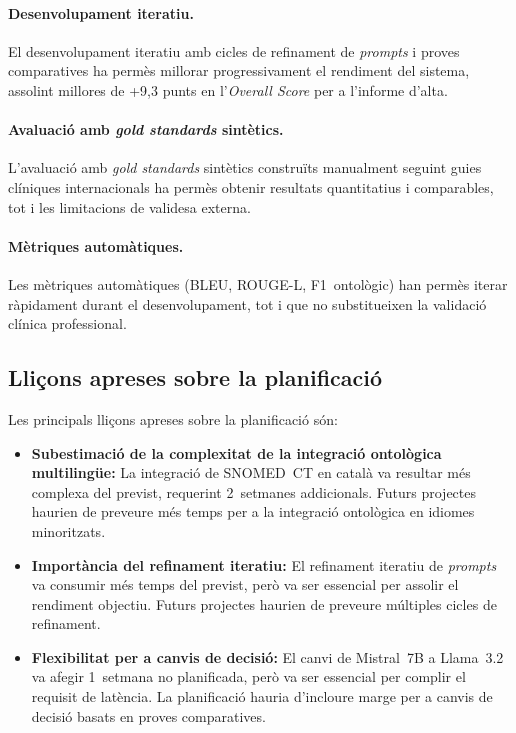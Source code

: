 \documentclass[CAT]{TFUOC}%
\begin{document}
\paragraph{Desenvolupament iteratiu.}
El desenvolupament iteratiu amb cicles de refinament de \textit{prompts} i proves comparatives ha permès millorar progressivament el rendiment del sistema, assolint millores de +9,3 punts en l'\textit{Overall Score} per a l'informe d'alta.

\paragraph{Avaluació amb \textit{gold standards} sintètics.}
L'avaluació amb \textit{gold standards} sintètics construïts manualment seguint guies clíniques internacionals ha permès obtenir resultats quantitatius i comparables, tot i les limitacions de validesa externa.

\paragraph{Mètriques automàtiques.}
Les mètriques automàtiques (BLEU, ROUGE-L, F1~ontològic) han permès iterar ràpidament durant el desenvolupament, tot i que no substitueixen la validació clínica professional.

\subsection{Lliçons apreses sobre la planificació}

Les principals lliçons apreses sobre la planificació són:

\begin{itemize}
    \item \textbf{Subestimació de la complexitat de la integració ontològica multilingüe:} La integració de SNOMED~CT en català va resultar més complexa del previst, requerint 2~setmanes addicionals. Futurs projectes haurien de preveure més temps per a la integració ontològica en idiomes minoritzats.
    
    \item \textbf{Importància del refinament iteratiu:} El refinament iteratiu de \textit{prompts} va consumir més temps del previst, però va ser essencial per assolir el rendiment objectiu. Futurs projectes haurien de preveure múltiples cicles de refinament.
    
    \item \textbf{Flexibilitat per a canvis de decisió:} El canvi de Mistral~7B a Llama~3.2 va afegir 1~setmana no planificada, però va ser essencial per complir el requisit de latència. La planificació hauria d'incloure marge per a canvis de decisió basats en proves comparatives.
\end{itemize}
\end{document}
